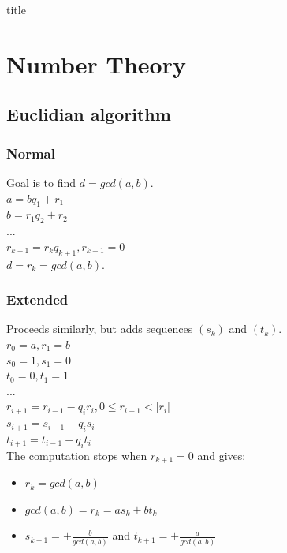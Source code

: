 \documentclass{article}
\begin{document}
{title}

\frontmatter

\tableofcontents


\mainmatter

\section{Number Theory}

\subsection{Euclidian algorithm}

\subsubsection{Normal}

Goal is to find $d = gcd(a,b)$.\\
$a = bq_1 + r_1$\\
$b = r_1 q_2 + r_2$\\
...\\
$r_{k-1} = r_k q_{k+1}, r_{k+1}=0$\\
$d = r_k = gcd(a,b)$.

\subsubsection{Extended}

Proceeds similarly, but adds sequences $(s_k)$ and $(t_k)$.\\
$r_0 = a, r_1 = b$\\
$s_0 = 1, s_1 = 0$\\
$t_0 = 0, t_1 = 1$\\
...\\
$r_{i+1} = r_{i-1} - q_i r_i, 0 \leq r_{i+1} < \vert r_i \vert$\\
$s_{i+1} = s_{i-1} - q_i s_i$\\
$t_{i+1} = t_{i-1} - q_i t_i$\\
The computation stops when $r_{k+1} = 0$ and gives:
\begin{itemize}
    \item $r_k = gcd(a,b)$
    \item $gcd(a,b) = r_k = a s_k + b t_k$
    \item $s_{k+1} = \pm \frac{b}{gcd(a,b)}$ and $t_{k+1} = \pm \frac{a}{gcd(a,b)}$
\end{itemize}
\end{document}
